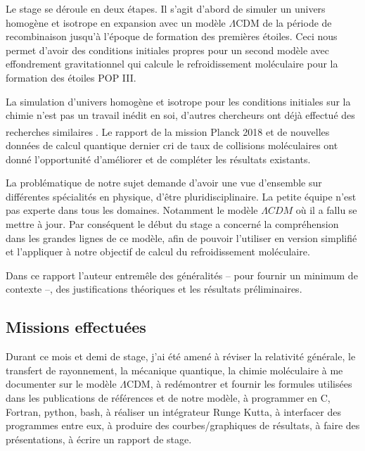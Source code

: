 \documentclass[10pt, a4paper]{report}
\numberwithin{equation}{subsection}
\begin{document}
Le stage se déroule en deux étapes. Il s'agit d'abord de simuler un univers homogène et isotrope en expansion avec un modèle $\Lambda$CDM de la période de recombinaison jusqu'à l'époque de formation des premières étoiles. Ceci nous permet d'avoir des conditions initiales propres pour un second modèle avec effondrement gravitationnel qui calcule le refroidissement moléculaire pour la formation des étoiles POP III.

La simulation d'univers homogène et isotrope pour les conditions initiales sur la chimie n'est pas un travail inédit en soi, d'autres chercheurs ont déjà effectué des recherches similaires\textsuperscript{\cite{Coppola} \cite{Flower}}. Le rapport de la mission Planck 2018\textsuperscript{\cite{Planck2018}} et de nouvelles données de calcul quantique dernier cri de taux de collisions moléculaires ont donné l'opportunité d'améliorer et de compléter les résultats existants. 

La problématique de notre sujet demande d'avoir une vue d'ensemble sur différentes spécialités en physique, d'être pluridisciplinaire. La petite équipe n'est pas experte dans tous les domaines. Notamment le modèle $\Lambda CDM$ où il a fallu se mettre à jour. Par conséquent le début du stage a concerné la compréhension dans les grandes lignes de ce modèle, afin de pouvoir l'utiliser en version simplifié et l'appliquer à notre objectif de calcul du refroidissement moléculaire.

Dans ce rapport l'auteur entremêle des généralités -- pour fournir un minimum de contexte --, des justifications théoriques et les résultats préliminaires.


\subsection*{Missions effectuées}

Durant ce mois et demi de stage, j'ai été amené à réviser la relativité générale, le transfert de rayonnement, la mécanique quantique, la chimie moléculaire à me documenter sur le modèle $\Lambda$CDM, à redémontrer et fournir les formules utilisées dans les publications de références et de notre modèle, à programmer en C, Fortran, python, bash, à réaliser un intégrateur Runge Kutta, à interfacer des programmes entre eux, à produire des courbes/graphiques de résultats, à faire des présentations, à écrire un rapport de stage.
\end{document}
